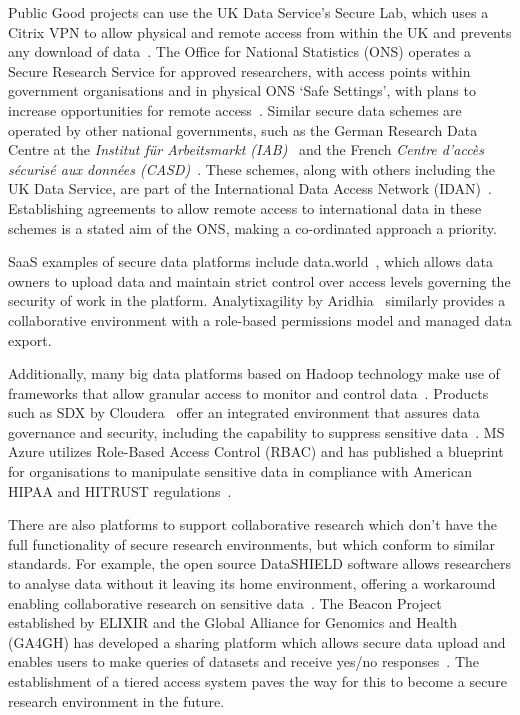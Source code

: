 \documentclass[10pt,a4paper,twocolumn]{article}
\begin{document}
Public Good projects can use the UK Data Service’s Secure Lab, which uses a Citrix VPN to allow physical and remote access from within the UK and prevents any download of data~\cite{SecureDataLab}. The Office for National Statistics (ONS) operates a Secure Research Service for approved researchers, with access points within government organisations and in physical ONS ‘Safe Settings’, with plans to increase opportunities for remote access~\cite{SecureResearchService}. Similar secure data schemes are operated by other national governments, such as the German Research Data Centre at the \textit{Institut für Arbeitsmarkt (IAB)}~\cite{IAB} and the French \textit{Centre d'accès sécurisé aux données (CASD)}~\cite{CASD}. These schemes, along with others including the UK Data Service, are part of the International Data Access Network (IDAN)~\cite{IDAN}. Establishing agreements to allow remote access to international data in these schemes is a stated aim of the ONS, making a co-ordinated approach a priority.

SaaS examples of secure data platforms include data.world~\cite{dataworld}, which allows data owners to upload data and maintain strict control over access levels governing the security of work in the platform. Analytixagility by Aridhia~\cite{aridhia} similarly provides a collaborative environment with a role-based permissions model and managed data export.  

Additionally, many big data platforms based on Hadoop technology make use of frameworks that allow granular access to monitor and control data~\cite{ranger}. Products such as SDX by Cloudera~\cite{sdx} offer an integrated environment that assures data governance and security, including the capability to suppress sensitive data~\cite{dataredaction}. MS Azure utilizes Role-Based Access Control (RBAC) and has published a blueprint for organisations to manipulate sensitive data in compliance with American HIPAA and HITRUST regulations~\cite{HIPAA}.

There are also platforms to support collaborative research which don’t have the full functionality of secure research environments, but which conform to similar standards. For example, the open source DataSHIELD software allows researchers to analyse data without it leaving its home environment, offering a workaround enabling collaborative research on sensitive data~\cite{wilson2017datashield}. The Beacon Project established by ELIXIR and the Global Alliance for Genomics and Health (GA4GH) has developed a sharing platform which allows secure data upload and enables users to make queries of datasets and receive yes/no responses~\cite{Beacon}. The establishment of a tiered access system paves the way for this to become a secure research environment in the future.
\end{document}
